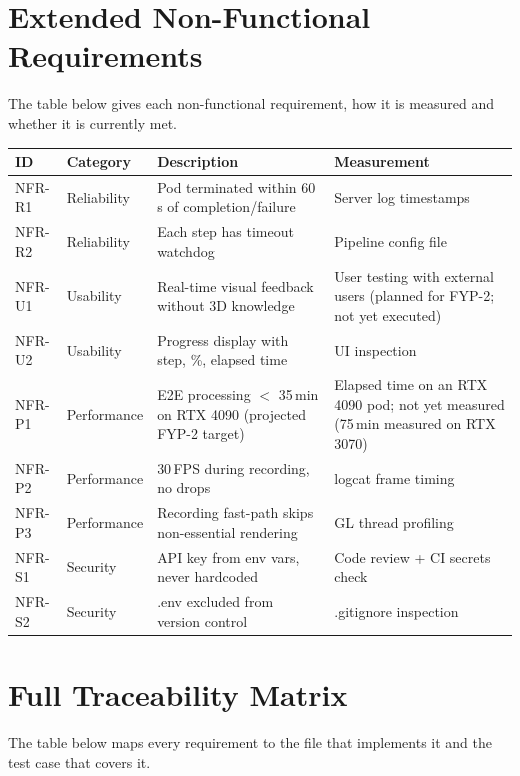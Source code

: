 \section{Extended Non-Functional Requirements}

The table below gives each non-functional requirement, how it is measured and whether it is currently met.

\begin{longtable}{p{}p{}p{}p{}}
\toprule
\textbf{ID} & \textbf{Category} & \textbf{Description} & \textbf{Measurement} \\
\midrule
NFR-R1 & Reliability & Pod terminated within 60\,s of completion/failure & Server log timestamps \\
NFR-R2 & Reliability & Each step has timeout watchdog & Pipeline config file \\
NFR-U1 & Usability & Real-time visual feedback without 3D knowledge & User testing with external users (planned for FYP-2; not yet executed) \\
NFR-U2 & Usability & Progress display with step, \%, elapsed time & UI inspection \\
NFR-P1 & Performance & E2E processing $<$ 35\,min on RTX 4090 (projected FYP-2 target) & Elapsed time on an RTX 4090 pod; not yet measured (75\,min measured on RTX 3070) \\
NFR-P2 & Performance & 30\,FPS during recording, no drops & logcat frame timing \\
NFR-P3 & Performance & Recording fast-path skips non-essential rendering & GL thread profiling \\
NFR-S1 & Security & API key from env vars, never hardcoded & Code review + CI secrets check \\
NFR-S2 & Security & .env excluded from version control & .gitignore inspection \\
\bottomrule
\end{longtable}

\section{Full Traceability Matrix}

The table below maps every requirement to the file that implements it and the test case that covers it.

